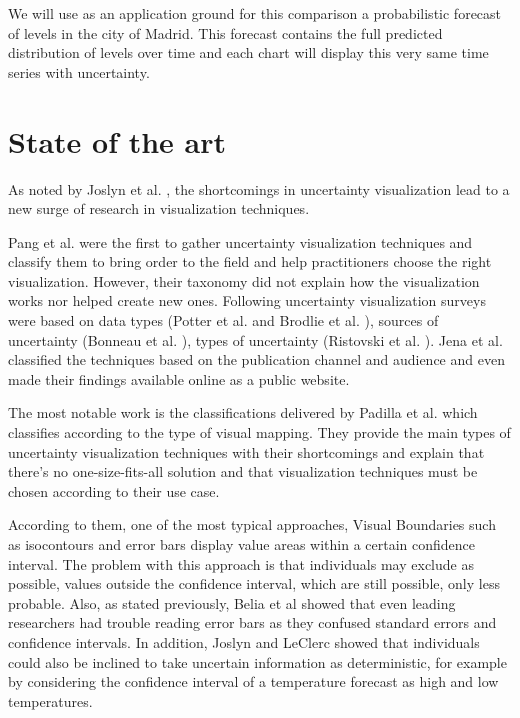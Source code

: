 \documentclass[a4paper,3p,sort&compress]{elsarticle}
\begin{document}
We will use as an application ground for this comparison a probabilistic forecast of \no levels 
in the city of Madrid. This forecast contains the full predicted distribution of \no levels over time
and each chart will display this very same time series with uncertainty. 

\section{State of the art}
\label{sec:results}

As noted by Joslyn et al. \cite{joslyn_communicating_2010}, the shortcomings in uncertainty visualization lead to a new surge of 
research in visualization techniques. 

Pang et al. \cite{pang_approaches_1997} were the first to gather uncertainty visualization techniques and classify them 
to bring order to the field and help 
practitioners choose the right visualization. However, their taxonomy did not explain how the visualization works nor helped create new 
ones. Following uncertainty visualization surveys were based on data types (Potter et al. \cite{potter_quantification_2012} and Brodlie et al. 
\cite{brodlie_review_2012}), 
sources of uncertainty (Bonneau et al. \cite{bonneau_overview_2014}), types of uncertainty 
(Ristovski et al. \cite{ristovski_uncertainty_2014}). Jena et al. \cite{jena_uncertainty_2020} classified the techniques 
based on the publication channel and audience and even made their findings available online as a 
public website. 

The most notable work is the classifications delivered by Padilla et al. \cite{padilla_uncertainty_2021} which classifies according to 
the type of visual mapping. They provide the main types of uncertainty visualization techniques with their shortcomings and 
explain that there's no one-size-fits-all solution and that visualization techniques must be chosen according to their use case.

According to them, one of the most typical approaches, Visual Boundaries such as isocontours and error 
bars display value areas within a certain confidence interval. The problem with this approach is 
that individuals may exclude as possible, values outside the confidence interval, which are still 
possible, only less probable. Also, as stated previously, Belia et al \cite{belia_researchers_2005} showed that even leading researchers had 
trouble reading error bars as they confused 
standard errors and confidence intervals. In addition, Joslyn and LeClerc \cite{joslyn_decisions_2013} 
showed that individuals could also be inclined to take uncertain 
information as deterministic, for example by considering the confidence interval of a temperature 
forecast as high and low temperatures. 
\end{document}
